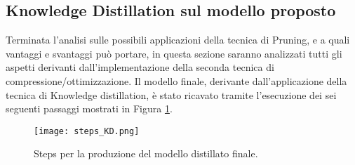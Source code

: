 \subsection{Knowledge Distillation sul modello proposto}
Terminata l'analisi sulle possibili applicazioni della tecnica di Pruning, e a quali vantaggi e svantaggi può portare, in questa sezione saranno analizzati tutti gli aspetti derivanti dall'implementazione della seconda tecnica di compressione/ottimizzazione. Il modello finale, derivante dall'applicazione della tecnica di Knowledge distillation, è stato ricavato tramite l'esecuzione dei sei seguenti passaggi mostrati in Figura \ref{steps_KD}.
\begin{figure}
    \centering
    \texttt{[image: steps\_KD.png]}
    \centering
    \caption{Steps per la produzione del modello distillato finale.}
    \label{steps_KD}
\end{figure}

